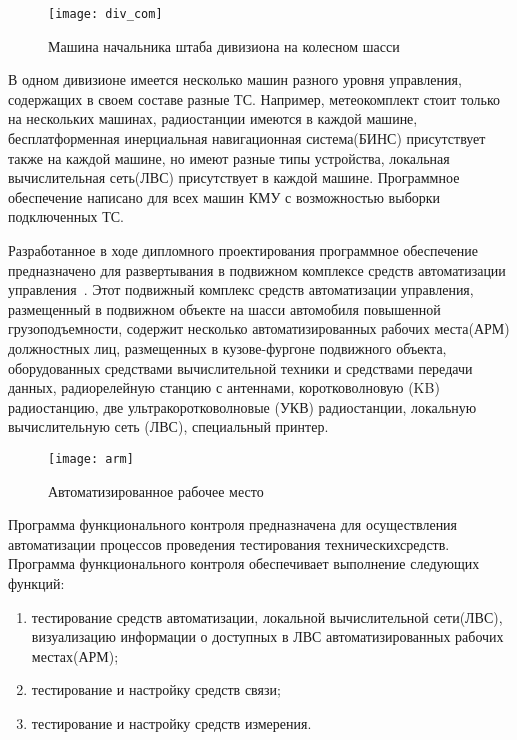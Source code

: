 \begin{figure}[ht]
	\centering
	\texttt{[image: div\_com]}
	\caption{Машина начальника штаба дивизиона на колесном шасси~\cite{div_car}}
	\label{fig:lit_reiview:analytics:div_com}
\end{figure}
В одном дивизионе имеется несколько машин разного уровня управления, содержащих в своем составе разные ТС.
Например, метеокомплект стоит только на нескольких машинах, радиостанции имеются в каждой машине, бесплатформенная
инерциальная навигационная система(БИНС) присутствует также на каждой машине, но имеют разные типы устройства, локальная
вычислительная сеть(ЛВС) присутствует в каждой машине.\break\break
Программное обеспечение написано для всех машин КМУ с возможностью выборки подключенных ТС.

Разработанное в ходе дипломного проектирования программное обеспечение предназначено для развертывания в подвижном
комплексе средств автоматизации управления~\cite{patent_2263960}.
Этот подвижный комплекс средств автоматизации управления, размещенный в подвижном объекте на шасси автомобиля повышенной
грузоподъемности, содержит несколько автоматизированных рабочих места(АРМ) должностных лиц, размещенных в кузове-фургоне
подвижного объекта, оборудованных средствами вычислительной техники и средствами передачи данных, радиорелейную станцию
с антеннами, коротковолновую (KB) радиостанцию, две ультракоротковолновые (УКВ) радиостанции, локальную вычислительную
сеть (ЛВС), специальный принтер.

\begin{figure}[ht]
	\centering
	\texttt{[image: arm]}
	\caption{Автоматизированное рабочее место~\cite{patent_2263960}}
	\label{fig:lit_reiview:analytics:arm}
\end{figure}

Программа функционального контроля предназначена для осуществления автоматизации процессов проведения тестирования
технических\break средств.
Программа функционального контроля обеспечивает выполнение следующих функций:
\begin{enumerate}
\item тестирование средств автоматизации, локальной вычислительной сети(ЛВС), визуализацию информации о доступных в ЛВС автоматизированных рабочих местах(АРМ);
\item тестирование и настройку средств связи;
\item тестирование и настройку средств измерения.
\end{enumerate}

